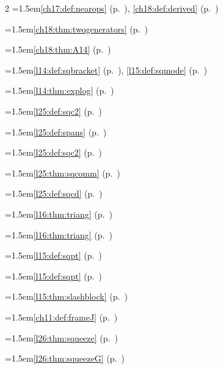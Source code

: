 \begin{multicols}{2}
\hangindent=1.5em\quad \ref{ch17:def:nearops} (p.~\pageref{ch17:def:nearops}), \ref{ch18:def:derived} (p.~\pageref{ch18:def:derived})\par
\hangindent=1.5em\quad \ref{ch18:thm:twogenerators} (p.~\pageref{ch18:thm:twogenerators})\par
\hangindent=1.5em\quad \ref{ch18:thm:A14} (p.~\pageref{ch18:thm:A14})\par
\hangindent=1.5em\quad \ref{l14:def:sqbracket} (p.~\pageref{l14:def:sqbracket}), \ref{l15:def:sqmode} (p.~\pageref{l15:def:sqmode})\par
\hangindent=1.5em\quad \ref{l14:thm:explog} (p.~\pageref{l14:thm:explog})\par
\hangindent=1.5em\quad \ref{l25:def:sqc2} (p.~\pageref{l25:def:sqc2})\par
\hangindent=1.5em\quad \ref{l25:def:spans} (p.~\pageref{l25:def:spans})\par
\hangindent=1.5em\quad \ref{l25:def:sqc2} (p.~\pageref{l25:def:sqc2})\par
\hangindent=1.5em\quad \ref{l25:thm:sqcomm} (p.~\pageref{l25:thm:sqcomm})\par
\hangindent=1.5em\quad \ref{l25:def:sqcd} (p.~\pageref{l25:def:sqcd})\par
\hangindent=1.5em\quad \ref{l16:thm:triang} (p.~\pageref{l16:thm:triang})\par
\hangindent=1.5em\quad \ref{l16:thm:triang} (p.~\pageref{l16:thm:triang})\par
\hangindent=1.5em\quad \ref{l15:def:sqpt} (p.~\pageref{l15:def:sqpt})\par
\hangindent=1.5em\quad \ref{l15:def:sqpt} (p.~\pageref{l15:def:sqpt})\par
\hangindent=1.5em\quad \ref{l15:thm:slashblock} (p.~\pageref{l15:thm:slashblock})\par
\hangindent=1.5em\quad \ref{ch11:def:frameJ} (p.~\pageref{ch11:def:frameJ})\par
\hangindent=1.5em\quad \ref{l26:thm:squeeze} (p.~\pageref{l26:thm:squeeze})\par
\hangindent=1.5em\quad \ref{l26:thm:squeezeG} (p.~\pageref{l26:thm:squeezeG})\par

\end{multicols}
